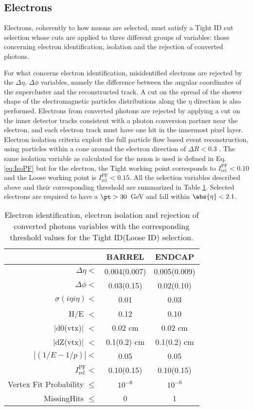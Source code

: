 \subsection{Electrons}

Electrons, coherently to how muons are selected, 
must satisfy a Tight ID cut selection
whose cuts are applied to three different groups of 
variables: those concerning electron identification, isolation 
and the rejection of converted photons.

For what concerns electron identification, 
misidentified electrons are rejected by the $\Delta\eta$,
$\Delta\phi$ variables, namely the difference between the angular
coordinates of the supercluster and the reconstructed track. 
A cut on the spread of the
shower shape of the electromagnetic particles distributions along the
$\eta$ direction is also performed. 
Electrons from
converted photons are rejected by applying a cut on the inner detector
tracks consistent with a photon conversion partner near the electron,
and each electron track must have one hit in the innermost pixel
layer.  
Electron isolation criteria exploit the full particle flow
based event reconstruction, using  particles within a cone around the
electron direction of $\Delta R < 0.3$ . The same isolation variable
as calculated for the muon is used is defined in Eq. \ref{eq:IsoPF} but
for the electron, the Tight working point corresponds to 
$I_{\text{rel}}^{\text{PF}} < 0.10$ and the Loose working point is
$I_{\text{rel}}^{\text{PF}} < 0.15$. 
All the selection variables described above 
and their corresponding threshold 
are summarized in Table \ref{tab:elecuts}.
Selected electrons are required to have a $\pt>30$~GeV and fall within 
$\abs{\eta}<2.1$. 

\begin{table}[h]
\centering
\begin{tabular}{rcc}
\hline
& BARREL & ENDCAP\\
\hline
$\Delta \eta <$ & 0.004(0.007) & 0.005(0.009)\\
$\Delta \phi <$  & 0.03(0.15) & 0.02(0.10) \\
$\sigma(i\eta i\eta) <$   & 0.01 & 0.03 \\
H/E $<$  & 0.12 & 0.10 \\
\hline
$|$d0(vtx)$|$ $<$ & 0.02 cm & 0.02 cm \\
$|$dZ(vtx)$|$ $<$ & 0.1(0.2) cm & 0.1(0.2) cm \\
$|\left(1 / E - 1 / p\right)| < $ & 0.05 & 0.05 \\
$I_{\text{rel}}^{\text{PF}} < $ & 0.10(0.15) & 0.10(0.15) \\
Vertex Fit Probability $\leq$ & $10^{-6}$ & $10^{-6}$  \\
MissingHits $\leq$    & 0 & 1\\
 \hline
\end{tabular}
\caption{Electron identification, electron isolation and rejection of converted photons
variables with the corresponding threshold values for the Tight ID(Loose ID) selection.}
\label{tab:elecuts}
\end{table}

